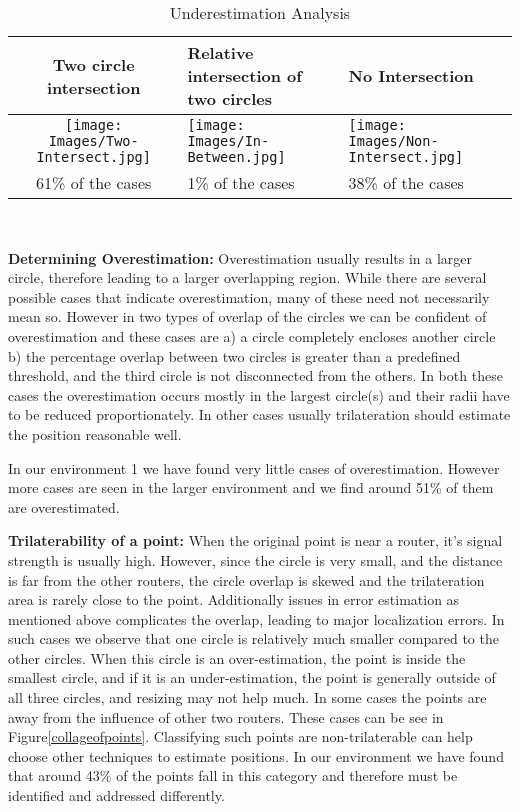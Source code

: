 \begin{table*}[h!]
\begin{tabular}{ | c | p{5cm} | p{5cm} | }
\hline
Two circle intersection & Relative intersection of two circles & No Intersection \\
\hline
\texttt{[image: Images/Two-Intersect.jpg]}
& 
\texttt{[image: Images/In-Between.jpg]}
& 
\texttt{[image: Images/Non-Intersect.jpg]}
\\ \hline
61\% of the cases & 1\% of the cases & 38\% of the cases
\\ \hline
\end{tabular}
\\
\caption{Underestimation Analysis}
\label{tbl:types_underest}
\end{table*}

\textbf{Determining Overestimation:} Overestimation usually results in a larger circle, therefore leading to a larger overlapping region. While there are several possible cases that indicate overestimation, many of these need not necessarily mean so. However in two types of overlap of the circles we can be confident of overestimation and these cases are 
a) a circle completely encloses another circle 
b) the percentage overlap between two circles is greater than a predefined threshold, and the third circle is not disconnected from the others. 
In both these cases the overestimation occurs mostly in the largest circle(s) and their radii have to be reduced proportionately. In other cases usually trilateration should estimate the position reasonable well.

In our environment 1 we have found very little cases of overestimation. However more cases are seen in the larger environment and we find around 51\% of them are overestimated.

\textbf{Trilaterability of a point:} When the original point is near a router, it's signal strength is usually high. However, since the circle is very small, and the distance is far from the other routers, the circle overlap is skewed and the trilateration area is rarely close to the point. Additionally issues in error estimation as mentioned above complicates the overlap, leading to major localization errors. In such cases we observe that one circle is relatively much smaller compared to the other circles. When this circle is an over-estimation, the point is inside the smallest circle, and if it is an under-estimation, the point is generally outside of all three circles, and resizing may not help much. In some cases the points are away from the influence of other two routers. These cases can be see in Figure\ref{collageofpoints}. Classifying such points are non-trilaterable can help choose other techniques to estimate positions. In our environment we have found that around 43\% of the points fall in this category and therefore must be identified and addressed differently. 

